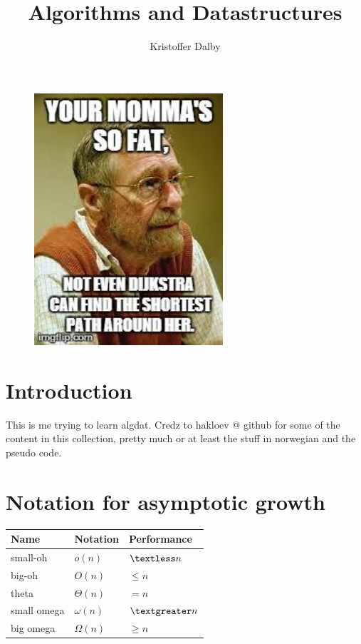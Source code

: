 \documentclass[a4paper, 10pt]{article}
\title{Algorithms and Datastructures}
\author{Kristoffer Dalby}
\date{}
\begin{document}
\maketitle
\begin{figure}[hbt]
    \begin{center}
        \includegraphics[width=7cm] {img/dijkstra.jpg}
    \end{center}
\end{figure}
\thispagestyle{empty}
\newpage
{}
\setcounter{page}{1}


\section{Introduction}
This is me trying to learn algdat. Credz to hakloev @ github for some of the content in this collection, pretty much or at least the stuff in norwegian and the pseudo code.


\section{Notation for asymptotic growth}


\begin{tabular}{|l|l|l|}
    \hline
    Name & Notation & Performance \\ \hline
    small-oh & $o(n)$ & $\textless n$ \\ \hline
    big-oh & $O(n)$ & $\le n$ \\ \hline
    theta & $\Theta(n)$ & $= n$ \\ \hline
    small omega & $\omega(n)$ & $\textgreater n$ \\ \hline
    big omega & $\Omega(n)$ & $\ge n$ \\ \hline
\end{tabular}
\end{document}

